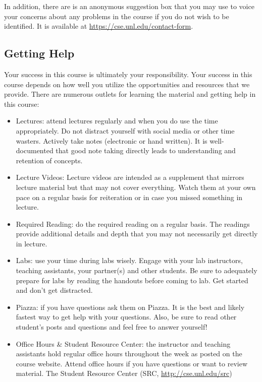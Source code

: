 \documentclass[12pt]{scrartcl}
\begin{document}
In addition, there are is an anonymous suggestion box that you may 
use to voice your concerns about any problems in the course if you 
do not wish to be identified. It is available at 
\url{https://cse.unl.edu/contact-form}.

\subsection{Getting Help}

Your success in this course is ultimately your responsibility.  Your
success in this course depends on how well you utilize the opportunities
and resources that we provide.  There are numerous outlets for learning
the material and getting help in this course:
\begin{itemize}
  \item Lectures: attend lectures regularly and when you do use the 
  time appropriately.  Do not distract yourself with social media or other
  time wasters.  Actively take notes (electronic or hand written).  It is
  well-documented that good note taking directly leads to understanding and
  retention of concepts.
  \item Lecture Videos: Lecture videos are intended as a supplement
  that mirrors lecture material but that may not cover everything.  Watch
  them at your own pace on a regular basis for reiteration or in case
  you missed something in lecture.  
  \item Required Reading: do the required reading on a regular basis.  The
  readings provide additional details and depth that you may not necessarily
  get directly in lecture.  
  \item Labs: use your time during labs 
  wisely.  Engage with your lab instructors, teaching assistants, your partner(s)
  and other students.  Be sure to adequately prepare for labs by reading
  the handouts before coming to lab.  Get started and don't get distracted.
  \item Piazza: if you have questions ask them on Piazza.  It is the best and
  likely fastest way to get help with your questions.  Also, be sure to read
  other student's posts and questions and feel free to answer yourself!
  \item Office Hours \& Student Resource Center: the instructor and teaching
  assistants hold regular office hours throughout the week as posted on the
  course website.  Attend office hours if you have questions or want to 
  review material.  The Student Resource Center (SRC, \url{http://cse.unl.edu/src})

\end{itemize}
\end{document}
